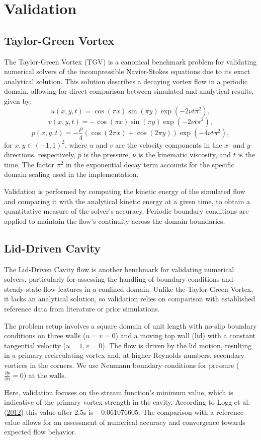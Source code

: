 \section{Validation}

\subsection{Taylor-Green Vortex}
The Taylor-Green Vortex (TGV) is a canonical benchmark problem for validating numerical solvers of the incompressible Navier-Stokes equations due to its exact analytical solution.
This solution describes a decaying vortex flow in a periodic domain, allowing for direct comparison between simulated and analytical results, given by:
\[
u(x, y, t) = \cos(\pi x) \sin(\pi y) \exp(-2 \nu t \pi^2),
\]
\[
v(x, y, t) = -\cos(\pi x) \sin(\pi y) \exp(-2 \nu t \pi^2),
\]
\[
p(x, y, t) = -\frac{\rho}{4} \left( \cos(2\pi x) + \cos(2\pi y) \right) \exp(-4 \nu t \pi^2),
\]
for \( x,y \in (-1,1)^2 \), where \( u \) and \( v \) are the velocity components in the \( x \)- and \( y \)-directions, respectively, \( p \) is the pressure, \( \nu \) is the kinematic viscosity, and \( t \) is the time.
The factor \( \pi^2 \) in the exponential decay term accounts for the specific domain scaling used in the implementation.

Validation is performed by computing the kinetic energy of the simulated flow and comparing it with the analytical kinetic energy at a given time, to obtain a quantitative measure of the solver's accuracy.
Periodic boundary conditions are applied to maintain the flow's continuity across the domain boundaries.

\subsection{Lid-Driven Cavity}

The Lid-Driven Cavity flow is another benchmark for validating numerical solvers, particularly for assessing the handling of boundary conditions and steady-state flow features in a confined domain.
Unlike the Taylor-Green Vortex, it lacks an analytical solution, so validation relies on comparison with established reference data from literature or prior simulations.

The problem setup involves a square domain of unit length with no-slip boundary conditions on three walls (\( u = v = 0 \)) and a moving top wall (lid) with a constant tangential velocity (\( u = 1, v = 0 \)).
The flow is driven by the lid motion, resulting in a primary recirculating vortex and, at higher Reynolds numbers, secondary vortices in the corners.
We use Neumann boundary conditions for pressure (\( \frac{\partial p}{\partial n} = 0 \)) at the walls.

Here, validation focuses on the stream function's minimum value, which is indicative of the primary vortex strength in the cavity.
According to Logg et al. (\href{https://doi.org/10.1007/978-3-642-23099-8}{2012}) this value after $2.5$s is $-0.061076605$.
The comparison with a reference value allows for an assessment of numerical accuracy and convergence towards expected flow behavior.
